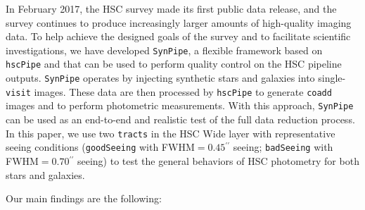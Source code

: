 \documentclass[useamsfonts]{pasj01}
\def\asec{$^{\prime\prime}$}
\def\hscpipe{\texttt{hscPipe}}
\def\synpipe{\texttt{SynPipe}}
\def\coadd{\texttt{coadd}}
\def\visit{\texttt{visit}}
\def\tracts{\texttt{tracts}}
\begin{document}
    In February 2017, the HSC survey made its first public data release, and the survey 
    continues to produce increasingly larger amounts of high-quality imaging data.
    To help achieve the designed goals of the survey and to facilitate scientific 
    investigations, we have developed \synpipe{}, a flexible framework based on
    \hscpipe{} and that can be used to perform quality control on the HSC pipeline 
    outputs. 
    \synpipe{} operates by injecting synthetic stars and galaxies into single-\visit{}
    images. 
    These data are then processed by \hscpipe{} to generate \coadd{} images and to 
    perform photometric measurements. 
    With this approach, \synpipe{} can be used as an end-to-end and realistic test of 
    the full data reduction process. 
    In this paper, we use two \tracts{} in the HSC Wide layer with representative 
    seeing conditions (\texttt{goodSeeing} with FWHM$=0.45$\asec{} seeing; 
    \texttt{badSeeing} with FWHM$=0.70$\asec{} seeing) to test the general behaviors 
    of HSC photometry for both stars and galaxies.

    Our main findings are the following:
\end{document}
